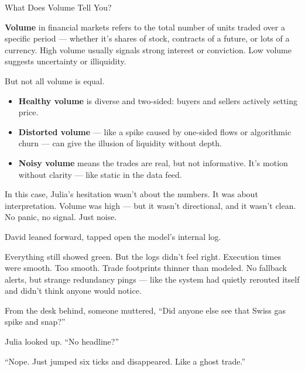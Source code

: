 \begin{TechnicalSidebar}{What Does Volume Tell You?}

  \textbf{Volume} in financial markets refers to the total number of units traded over a specific period — whether it's 
  shares of stock, contracts of a future, or lots of a currency. High volume usually signals strong interest or 
  conviction. Low volume suggests uncertainty or illiquidity.
  
  \medskip
  
  But not all volume is equal.
  
  \begin{itemize}
    \item \textbf{Healthy volume} is diverse and two-sided: buyers and sellers actively setting price.
    \item \textbf{Distorted volume} — like a spike caused by one-sided flows or algorithmic churn — can give the illusion 
    of liquidity without depth.
    \item \textbf{Noisy volume} means the trades are real, but not informative. It’s motion without clarity — like static 
    in the data feed.
  \end{itemize}
  
  \medskip
  
  In this case, Julia’s hesitation wasn’t about the numbers. It was about interpretation. Volume was high — but it wasn’t 
  directional, and it wasn’t clean. No panic, no signal. Just noise.
  
\end{TechnicalSidebar}

\medskip


David leaned forward, tapped open the model’s internal log.

Everything still showed green.
But the logs didn’t feel right.
Execution times were smooth. Too smooth.
Trade footprints thinner than modeled.
No fallback alerts, but strange redundancy pings — like the system had quietly rerouted itself and didn’t think anyone would notice.

From the desk behind, someone muttered, “Did anyone else see that Swiss gas spike and snap?”

Julia looked up. “No headline?”

“Nope. Just jumped six ticks and disappeared. Like a ghost trade.”

\medskip

